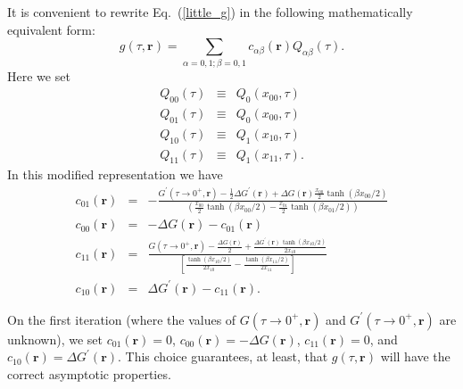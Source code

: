 It is convenient to rewrite Eq.~(\ref{little_g})
in the following mathematically equivalent form:
\begin{equation}
g(\tau, \mathbf{r}) = \sum_{\alpha = 0,1; \beta = 0, 1}
c_{\alpha\beta}(\mathbf{r}) Q_{\alpha\beta}(\tau).
\end{equation}
Here we set
\begin{eqnarray}
Q_{00}(\tau) & \equiv & Q_0(x_{00},\tau) \\
Q_{01}(\tau) & \equiv & Q_0(x_{00},\tau) \\
Q_{10}(\tau) & \equiv & Q_1(x_{10},\tau) \\
Q_{11}(\tau) & \equiv & Q_1(x_{11},\tau). 
\end{eqnarray}
In this modified representation we have
\begin{eqnarray}
c_{01}(\mathbf{r}) & = & - \frac{ G^{\prime}(\tau \to 0^+, \mathbf{r}) -
\frac{1}{2}\Delta G^{\prime}(\mathbf{r}) +
 \Delta G(\mathbf{r}) \frac{x_{00}}{2} 
\tanh(\beta x_{00}/2) }
{\left(\frac{x_{00}}{2} \tanh(\beta x_{00}/2)
- \frac{x_{01}}{2} \tanh(\beta x_{01}/2) \right)} \\
c_{00}(\mathbf{r}) & = & - \Delta G(\mathbf{r}) - 
c_{01}(\mathbf{r}) \\
c_{11}(\mathbf{r}) & = & \frac{G(\tau \to 0^+, \mathbf{r}) - 
\frac{\Delta G(\mathbf{r})}{2}
+ \frac{\Delta G^{\prime}(\mathbf{r})
\,\tanh(\beta x_{10}/2)}{2 x_{10}}}{
\left[\frac{\tanh(\beta x_{10}/2)}{2 x_{10}}
 - \frac{\tanh(\beta x_{11}/2)}{2 x_{11}} \right]} \\
c_{10}(\mathbf{r}) & = & \Delta G^{\prime}(\mathbf{r}) - c_{11}(\mathbf{r}).
\end{eqnarray}

On the first iteration (where the values of $G(\tau \to 0^{+},\mathbf{r})$
and $G^{\prime}(\tau \to 0^+,\mathbf{r})$ are unknown), we set
$c_{01}(\mathbf{r}) = 0$, $c_{00}(\mathbf{r}) = - \Delta G(\mathbf{r})$,
$c_{11}(\mathbf{r}) = 0$, and $c_{10}(\mathbf{r}) =
\Delta G^{\prime}(\mathbf{r})$.
This choice guarantees, at least, that $g(\tau,\mathbf{r})$ will
have the correct asymptotic properties.


